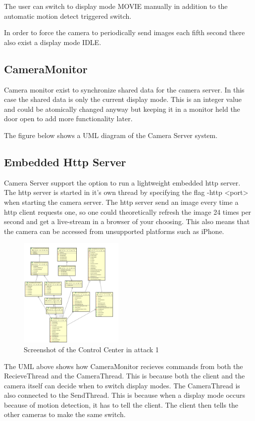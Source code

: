 \documentclass[8pt,titlepage]{article}
\begin{document}
The user can switch to display mode MOVIE manually in addition to the automatic motion detect triggered switch.

In order to force the camera to periodically send images each fifth second there also exist a display mode IDLE.

\subsection{CameraMonitor}
Camera monitor exist to synchronize shared data for the camera server. In this case the shared data is only the current display mode. This is an integer value and could be atomically changed anyway but keeping it in a monitor held the door open to add more functionality later.

The figure below shows a UML diagram of the Camera Server system. 

\subsection{Embedded Http Server}
Camera Server support the option to run a lightweight embedded http server. The http server is started in it’s own thread by specifying the flag -http <port> when starting the camera server. The http server send an image every time a http client requests one, so one could theoretically refresh the image 24 times per second and get a live-stream in a browser of your choosing. This also means that the camera can be accessed from unsupported platforms such as iPhone.

\begin{figure}[hbp]
\includegraphics[width=0.45\textwidth]{../uml/server.png}
\caption{Screenshot of the Control Center in attack 1}
\end{figure}

The UML above shows how CameraMonitor recieves commands from both the RecieveThread and the CameraThread. This is because both the client and the camera itself can decide when to switch display modes. The CameraThread is also connected to the SendThread. This is because when a display mode occurs because of motion detection, it has to tell the client. The client then tells the other cameras to make the same switch.
\end{document}
